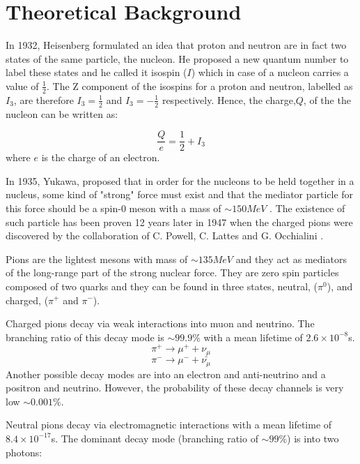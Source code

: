 \chapter{Theoretical Background}

\indent In 1932, Heisenberg formulated an idea that proton and neutron are in fact two states of the same particle, the nucleon. He proposed a new quantum number to label these states and he called it isospin ($I$) which in case of a nucleon carries a value of $\frac{1}{2}$. The Z component of the  isospins for a proton and neutron, labelled as $I_{3}$, are therefore $I_{3}=\frac{1}{2}$ and $I_{3}=-\frac{1}{2}$ respectively. Hence, the charge,$Q$, of the the nucleon can be written as:

\begin{equation}
\frac{Q}{e}=\frac{1}{2}+I_{3}
\end{equation}
where $e$ is the charge of an electron.

\indent In 1935, Yukawa, proposed that in order for the nucleons to be held together in a nucleus, some kind of "strong" force must exist and that the mediator particle for this force should be a spin-0 meson with a mass of $\sim150MeV$ \cite{dudek}. The existence of such particle has been proven 12 years later in 1947 when the charged pions were discovered by the collaboration of C. Powell, C. Lattes and G. Occhialini \cite{martin}.

\indent Pions are the lightest mesons with mass of $\sim135MeV$ and they act as mediators of the long-range part of the strong nuclear force. They are zero spin particles composed of two quarks and they can be found in three states, neutral, ($\pi^{0}$), and charged, ($\pi^{+}$ and $\pi^{-}$).

\indent Charged pions decay via weak interactions into muon and neutrino. The branching ratio of this decay mode is $\sim99.9\%$ with a mean lifetime of $2.6 \times 10^{-8}$s.
\begin{equation}
\pi^{+} \rightarrow \mu^{+} + \nu_{\mu}
\end{equation}
\begin{equation}
\pi^{-} \rightarrow \mu^{-} + \bar{\nu_{\mu}}
\end{equation}
Another possible decay modes are into an electron and anti-neutrino and a positron and neutrino. However, the probability of these decay channels is very low $\sim0.001\%$.

\indent Neutral pions decay via electromagnetic interactions with a mean lifetime of $8.4 \times 10^{-17}$s. The dominant decay mode (branching ratio of $\sim99\%$) is into two photons:


